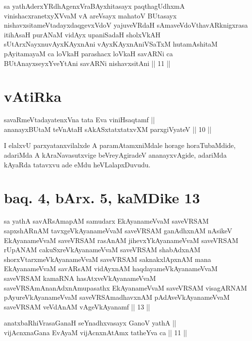 \begin{shl}
sa yathAderxYRdhAgenxVraBAyxhitasayx paqthagUdhxmA vinishacxranetxyXVvaM vA areV\s sayx mahatoV BUtasayx nishavxsitameVtadayxdaqgevxVdoV yajuveVRdaH sAmaveVdoV\s thavARknigxrasa itihAsaH purANaM vidAyx upaniSadaH sholxVkAH sUtArxNayxnuvAyxKAyxnAni vAyxKAyxnAniVSaTxM hutamAshitaM pAyitamayaM ca loVkaH parashacx loVkaH savARNi ca BUtAnayxseyxYveYtAni savARNi nishavxsitAni || 11 ||
\end{shl}

\section*{vAtiRka}

\begin{shl}
savaRmeVtadayatenxVna tata Eva viniHsaqtamf || \\
ananayxBUtaM teVnAtaH sAkASxtatxtatxvXM parxgiVyateV ||  10 ||  
\end{shl}

\begin{artha}
I elalxvU parxyatanxvilalxde A paramAtamxniMdale horage horaTubaMdide, adariMda A kAraNavasutxvige beVreyAgiradeV ananayxvAgide, adariMda kAyaRda tatavxvu ade eMdu heVLalapxDuvudu.
\end{artha}

\section*{baq. 4, bArx. 5, kaMDike 13}

\begin{shl}
sa yathA savARsAmapAM samudarx EkAyanameVvaM saveVRSAM sapxshARnAM tavxgeVkAyanameVvaM saveVRSAM ganAdhxnAM nAsikeV EkAyanameVvaM saveVRSAM rasAnAM jihevxYkAyanameVvaM saveVRSAM rUpANAM cakuSxreVkAyanameVvaM saveVRSAM shabAdxnAM shorxVtarxmeVkAyanameVvaM saveVRSAM saknakxlApxnAM mana EkAyanameVvaM savARsAM vidAyxnAM haqdayameVkAyanameVvaM saveVRSAM kamaRNA hasAtxveVkAyanameVvaM saveVRSAmAnanAdxnAmupasathx EkAyanameVvaM saveVRSAM visagARNAM pAyureVkAyanameVvaM saveVRSAmadhavxnAM pAdAveVkAyanameVvaM saveVRSAM veVdAnAM vAgeVkAyanamf || 13 ||
\end{shl}


\begin{shl}
anatxbaRhiVrasaGanaH seYnadhxvasayx GanoV yathA || \\
vijAcnxnaGana EvAyaM vijAcnxnAtAmx tatheYva ca ||  11 ||  
\end{shl}

